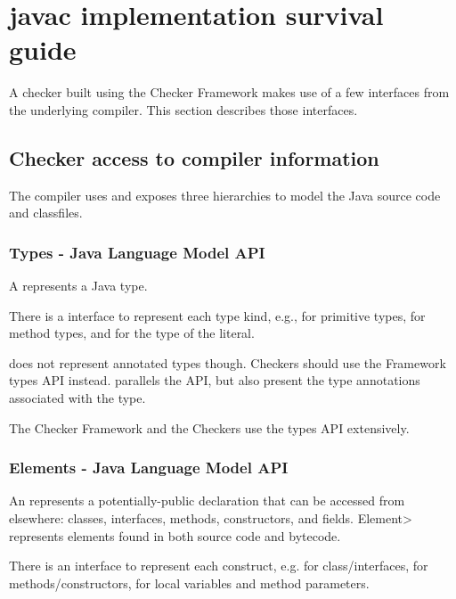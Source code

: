 \section{javac implementation survival guide\label{javac-tips}}

A checker built using the Checker Framework makes use of a few interfaces
from the underlying compiler.  This section describes those interfaces.




\subsection{Checker access to compiler information}

The compiler uses and exposes three hierarchies to model the Java
source code and classfiles.


\subsubsection{Types - Java Language Model API\label{javac-types}}

A  represents a Java type.

There is a  interface to represent each type kind,
e.g.,  for primitive types, 
for method types, and  for the type of the  literal.

 does not represent annotated types though.  Checkers should use the Framework types API  instead.   parallels the  API, but also present the type annotations associated with the type.

The Checker Framework and the Checkers use the types API extensively.


\subsubsection{Elements - Java Language Model API\label{javac-elements}}

An  represents a potentially-public
declaration that can be accessed from elsewhere:  classes, interfaces, methods, constructors, and
fields.  \<Element> represents elements found in both source
code and bytecode.

There is an  interface to represent each construct, e.g.
 for class/interfaces,  for
methods/constructors,  for local variables and
method parameters.

